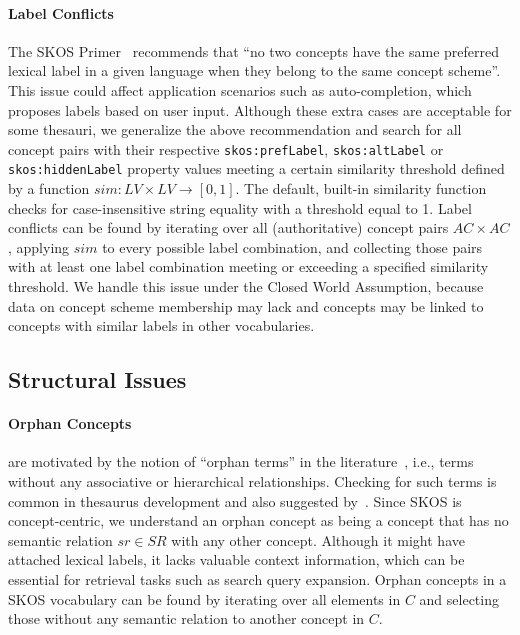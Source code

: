 {\paragraph{Label Conflicts}

The SKOS Primer~\cite{Isaac2009} recommends that ``no two concepts have the same preferred lexical label in a given language when they belong to the same concept scheme''. This issue could affect application scenarios such as auto-completion, which proposes labels based on user input. Although these extra cases are acceptable for some thesauri, we generalize the above recommendation and search for all concept pairs with their respective \texttt{skos:prefLabel}, \texttt{skos:altLabel} or \texttt{skos:hiddenLabel} property values meeting a certain similarity threshold defined by a function $sim:LV \times LV \rightarrow [0,1]$.
The default, built-in similarity function checks for case-insensitive string equality with a threshold equal to 1. Label conflicts can be found by iterating over all (authoritative) concept pairs $AC \times AC$, applying $sim$ to every possible label combination, and collecting those pairs with at least one label combination meeting or exceeding a specified similarity threshold. We handle this issue under the Closed World Assumption, because data on concept scheme membership may lack and concepts may be linked to concepts with similar labels in other vocabularies.


\subsection{Structural Issues}

\paragraph{Orphan Concepts}

are motivated by the notion of ``orphan terms'' in the literature~\cite{Hedden2010}, i.e., terms without any associative or hierarchical relationships. Checking for such terms is common in thesaurus development and also suggested by~\cite{Z39.19:2005}. Since SKOS is concept-centric, we understand an orphan concept as being a concept that has no semantic relation $sr \in SR$ with any other concept. Although it might have attached lexical labels, it lacks valuable context information, which can be essential for retrieval tasks such as search query expansion.
Orphan concepts in a SKOS vocabulary can be found by iterating over all elements in $C$ and selecting those without any semantic relation to another concept in $C$.

}
